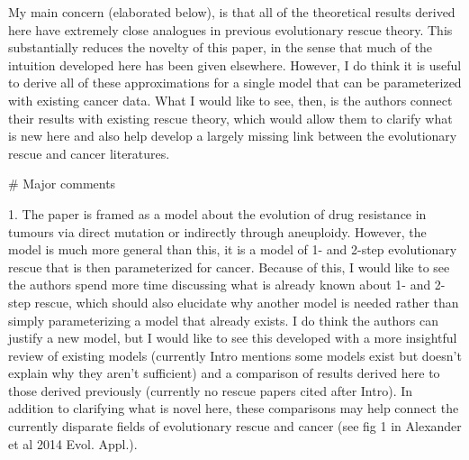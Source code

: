\documentclass[11pt,a4paper]{article}
\begin{document}
My main concern (elaborated below), is that all of the theoretical results derived here have extremely close analogues in previous evolutionary rescue theory. This substantially reduces the novelty of this paper, in the sense that much of the intuition developed here has been given elsewhere. However, I do think it is useful to derive all of these approximations for a single model that can be parameterized with existing cancer data. What I would like to see, then, is the authors connect their results with existing rescue theory, which would allow them to clarify what is new here and also help develop a largely missing link between the evolutionary rescue and cancer literatures.

$\#$ Major comments

1. The paper is framed as a model about the evolution of drug resistance in tumours via direct mutation or indirectly through aneuploidy. However, the model is much more general than this, it is a model of 1- and 2-step evolutionary rescue that is then parameterized for cancer. Because of this, I would like to see the authors spend more time discussing what is already known about 1- and 2-step rescue, which should also elucidate why another model is needed rather than simply parameterizing a model that already exists. I do think the authors can justify a new model, but I would like to see this developed with a more insightful review of existing models (currently Intro mentions some models exist but doesn't explain why they aren't sufficient) and a comparison of results derived here to those derived previously (currently no rescue papers cited after Intro). In addition to clarifying what is novel here, these comparisons may help connect the currently disparate fields of evolutionary rescue and cancer (see fig 1 in Alexander et al 2014 Evol. Appl.).
\end{document}
